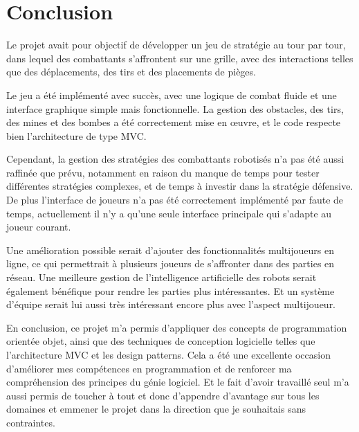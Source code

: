\documentclass[a4paper,12pt]{article}
\begin{document}
	\section{Conclusion}
	
	Le projet avait pour objectif de développer un jeu de stratégie au tour par tour, dans lequel des combattants s'affrontent sur une grille, avec des interactions telles que des déplacements, des tirs et des placements de pièges. 
	
	Le jeu a été implémenté avec succès, avec une logique de combat fluide et une interface graphique simple mais fonctionnelle. La gestion des obstacles, des tirs, des mines et des bombes a été correctement mise en œuvre, et le code respecte bien l'architecture de type MVC.
	
	Cependant, la gestion des stratégies des combattants robotisés n'a pas été aussi raffinée que prévu, notamment en raison du manque de temps pour tester différentes stratégies complexes, et de temps à investir dans la stratégie défensive. De plus l'interface de joueurs n'a pas été correctement implémenté par faute de temps, actuellement il n'y a qu'une seule interface principale qui s'adapte au joueur courant.
	
	Une amélioration possible serait d'ajouter des fonctionnalités multijoueurs en ligne, ce qui permettrait à plusieurs joueurs de s'affronter dans des parties en réseau. Une meilleure gestion de l'intelligence artificielle des robots serait également bénéfique pour rendre les parties plus intéressantes. Et un système d'équipe serait lui aussi très intéressant encore plus avec l'aspect multijoueur.
	
	En conclusion, ce projet m'a permis d'appliquer des concepts de programmation orientée objet, ainsi que des techniques de conception logicielle telles que l'architecture MVC et les design patterns. Cela a été une excellente occasion d'améliorer mes compétences en programmation et de renforcer ma compréhension des principes du génie logiciel. Et le fait d'avoir travaillé seul m'a aussi permis de toucher à tout et donc d'appendre d’avantage sur tous les domaines et emmener le projet dans la direction que je souhaitais sans contraintes.
\end{document}
